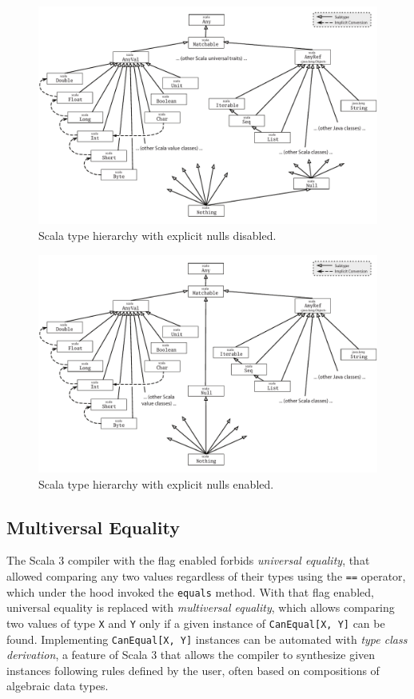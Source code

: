\begin{figure}
    \centering
    \includegraphics[width=.8\linewidth]{figures/scalaHierarchyWithMatchable.png}
    \caption{Scala type hierarchy with explicit nulls disabled.}
    \label{fig:scala-hierarchy-with-explicit-nulls-disabled}
\end{figure}

\begin{figure}
    \centering
    \includegraphics[width=.8\linewidth]{figures/scalaHierarchyWithMatchableAndSafeNull.png}
    \caption{Scala type hierarchy with explicit nulls enabled.}
    \label{fig:scala-hierarchy-with-explicit-nulls-enabled}
\end{figure}


\subsection{Multiversal Equality} \label{chap:background->sec:scala3->subsec:multiversal-equality}

The Scala 3 compiler with the  flag enabled forbids \textit{universal equality}, that allowed comparing any two values regardless of their types using the \texttt{==} operator, which under the hood invoked the \texttt{equals} method.
%
With that flag enabled, universal equality is replaced with \textit{multiversal equality}, which allows comparing two values of type \texttt{X} and \texttt{Y} only if a given instance of \texttt{CanEqual[X, Y]} can be found.
%
Implementing \texttt{CanEqual[X, Y]} instances can be automated with \textit{type class derivation}, a feature of Scala 3 that allows the compiler to synthesize given instances following rules defined by the user, often based on compositions of algebraic data types.
